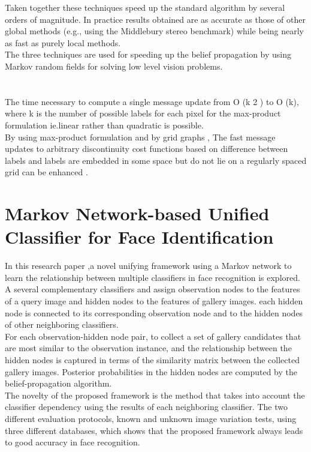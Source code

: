 Taken together these techniques speed up the standard algorithm by several orders of magnitude. In practice results  obtained   are as accurate as those of other global methods (e.g., using the Middlebury stereo benchmark) while being nearly as fast as purely local methods.
\\The three techniques are used for speeding up the belief propagation by using Markov random fields for solving low level vision problems.
\\\\\ \\ The time necessary to compute a single message update from O (k 2 ) to O (k), where k is the number of possible labels for each pixel for the max-product formulation ie.linear rather than quadratic is possible.
\\By using max-product formulation and by grid graphs , The fast message updates to arbitrary discontinuity cost functions based on difference between labels and labels are embedded in some space but do not lie on a regularly spaced grid can be enhanced .



\section{Markov Network-based Unified Classifier for Face Identification }
In this research paper ,a novel unifying framework using a Markov network to learn the relationship between multiple classifiers in face recognition is explored. \\A  several complementary classifiers and assign observation nodes to the features of a query image and hidden nodes to the features of gallery images. each hidden node is connected to its corresponding observation node and to the hidden nodes of other neighboring classifiers.\\ For each observation-hidden node pair, to  collect a set of gallery candidates that are most similar to the observation instance, and the relationship between the hidden nodes is captured in terms of the similarity matrix between the collected gallery images. Posterior probabilities in the hidden nodes are computed by the belief-propagation algorithm.\\ The novelty of the proposed framework is the method that takes into account the classifier dependency using the results of each neighboring classifier. The  two different evaluation protocols, known and unknown image variation tests, using three different databases, which shows that the proposed framework always leads to good accuracy in face recognition.\\

